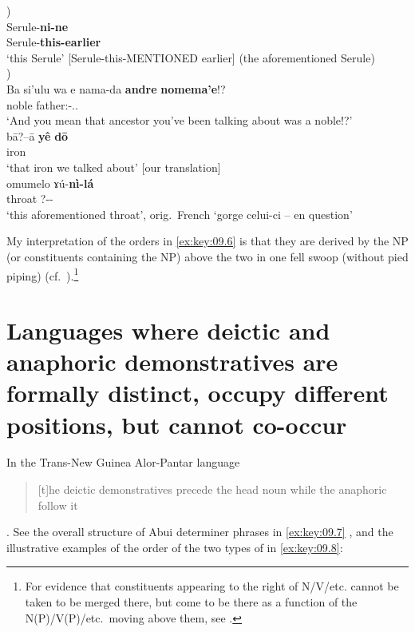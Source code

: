 \documentclass[output=paper]{langsci/langscibook}
\begin{document}
\ea\label{ex:key:09.6}
\ea\label{ex:key:09.6a} \parencite[225]{Eades2005})\\
		\gll Serule-\textbf{ni-ne}\\
			    Serule-\textbf{this-earlier}\\
		\glt ‘this Serule’ [Serule-this-MENTIONED earlier] (the aforementioned Serule)\\
        \ex\label{ex:key:09.6b} \parencite[579]{Brown2005})\\
		\gll Ba  si'ulu  wa  e  nama-da  \textbf{andre} \textbf{nomema'e}!?\\
            \Cnj{} noble \Dptcl{} \Dptcl{} father:\Mut{}-\Fpl.\Incl.\Poss{} \textbf{\Dem{}} \textbf{\Dem{}}\\
		\glt ‘And you mean that ancestor you’ve been talking about was a noble!?’
        \ex\label{ex:key:09.6c} \parencite[173]{Fabre2004}\\
		\gll b\=a?–\=a \textbf{yê} \textbf{d\=o}\\
			    iron \textbf{\Dem{}} \textbf{\Dem{}}\\
		\glt ‘that iron we talked about’ [our translation]
    \ex\label{ex:key:09.6d} \parencite[203]{Paluku1998}\\
		\gll omumelo  ɤú-\textbf{nì-lá}\\
            throat  \textsc{?}-\textbf{\Dem{}}-\textbf{\Dem{}}\\
		\glt ‘this aforementioned throat’, orig.\ French \enquote*{gorge celui-ci – en question}
	\z
\z

My interpretation of the orders in \eqref{ex:key:09.6} is that they are derived
by  the NP (or constituents containing the NP) above the two
 in one fell swoop (without pied piping)
(cf.\ \citealt{Cinque2005,Cinque2017}).\footnote{For evidence that constituents
appearing to the right of N/V/etc. cannot be taken to be merged there, but come
to be there as a function of the N(P)/V(P)/etc.\ moving above them, see
\citet{Cinque2009}.}

\section{Languages where deictic and anaphoric demonstratives are formally
distinct, occupy different positions, but cannot co-occur}

In the Trans-New Guinea Alor-Pantar language 
\parencites[§3.5.2]{Kratochvil2007}{Kratochvil2011} \blockquote{[t]he deictic
demonstratives precede the head noun while the anaphoric  follow
it} \parencite[156]{Kratochvil2007}. See the overall structure of Abui
determiner phrases in \eqref{ex:key:09.7} \parencite[156]{Kratochvil2007}, and the illustrative
examples of the order of the two types of  in \eqref{ex:key:09.8}:
\end{document}
